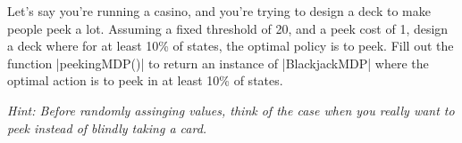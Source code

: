 \item {}
Let's say you're running a casino, and you're trying to design a deck to make
people peek a lot.  Assuming a fixed threshold of 20, and a peek cost of 1,
design a deck where for at least 10\% of states, the optimal policy is to peek.
Fill out the function |peekingMDP()| to return an instance of |BlackjackMDP|
where the optimal action is to peek in at least 10\% of states.

{\em Hint: Before randomly assinging values, think of the case when you really
want to peek instead of blindly taking a card.}
